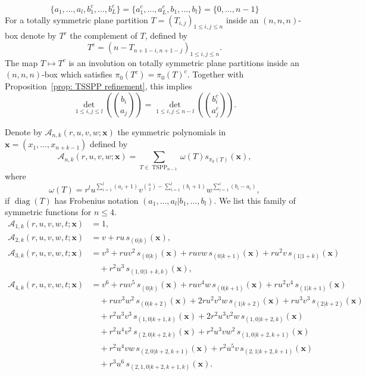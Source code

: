 \documentclass[11pt]{article}
\theoremstyle{definition}
\numberwithin{equation}{section}
\newcommand{\x}{\mathbf{x}}
\newcommand{\A}{\mathcal{A}}
\DeclareMathOperator{\TSPP}{TSPP}
\DeclareMathOperator{\diag}{diag}
\newcounter{x}
\newcounter{y}
\begin{document}
\begin{equation}
\label{eq: Frobenius coef of complement}
\{a_1,\ldots,a_l, b_1^c,\ldots, b_L^c \}=\{ a_1^c,\ldots,a_L^c,b_1,\ldots,b_l\}=\{0,\ldots,n-1\}
\end{equation}
For a totally symmetric plane partition $T=(T_{i,j})_{1 \leq i,j \leq n}$ inside an $(n,n,n)$-box denote by $T^c$ the complement of $T$, defined by
\[
T^c = (n-T_{n+1-i,n+1-j})_{1 \leq i,j \leq n}.
\]
The map $T \mapsto T^c$ is an involution on  totally symmetric plane partitions inside an $(n,n,n)$-box which satisfies $\pi_0(T^c) = \pi_0(T)^c$. Together with Proposition~\ref{prop: TSSPP refinement}, this implies
\begin{equation}
\label{eq: det of complement}
\det_{1 \leq i,j \leq l}\left( \binom{b_i}{a_j}\right) =
\det_{1 \leq i,j \leq n-l}\left( \binom{b_i^c}{a_j^c}\right).
\end{equation} 

Denote by $\A_{n,k}(r, u,v,w;\x)$ the symmetric polynomials in $\x=(x_1,\ldots,x_{n+k-1})$ defined by
\begin{equation}
\label{eq: def of A}
\A_{n,k}(r, u,v,w;\x)=\sum_{T \in \TSPP_{n-1}}\omega(T) s_{\pi_k(T)}(\x),
\end{equation}
where 
\begin{equation} 
\label{eq: weightpp} 
\omega(T)=r^l u^{\sum\limits_{i=1}^l (a_i+1)}  v^{\binom{n}{2}-\sum\limits_{i=1}^l (b_i+1)} w^{\sum\limits_{i=1}^l (b_i-a_i)},
\end{equation} 
if $\diag(T)$ has Frobenius notation $(a_1,\ldots,a_l|b_1,\ldots,b_l)$. We list this family of symmetric functions for $n\leq 4$.
\begin{align*}
\A_{1,k} (r, u,v,w,t;\x) &=1, \\
\A_{2,k} (r, u,v,w,t;\x) &= v + r u \,s_{(0|k)}(\x), \\
\A_{3,k} (r, u,v,w,t;\x) &=  v^3 + r  u v^2  \, s_{(0|k)}(\x) + 
	r  u v w  \,s_{(0|k+1)}(\x)+ r   u^2 v \,s_{(1|1+k)}(\x) \\
	& \quad +r^2 u^3 \,s_{(1,0|1+k,k)}(\x), \\ 
\A_{4,k} (r, u,v,w,t;\x) &=   v^6
	+r  u v^5  \,s_{(0|k)}(\x)
	+r  u v^4 w \,s_{(0|k+1)}(\x)
	+r  u^2 v^4 \,s_{(1|k+1)}(\x) \\
	& \quad 	+r  u v^3 w^2 \,s_{(0|k+2)}(\x) 
	+2r  u^2 v^3 w \,s_{(1|k+2)}(\x) 
	+r  u^3 v^3 \,s_{(2|k+2)}(\x)  \\
	& \quad 	+r^2  u^3 v^3 \,s_{(1,0|k+1,k)}(\x)
	+2r^2  u^3 v^2 w  \,s_{(1,0|k+2,k)}(\x) \\
	& \quad 	+r^2  u^4 v^2 \,s_{(2,0|k+2,k)}(\x)  
	 +r^2  u^3 v w^2 \,s_{(1,0|k+2,k+1)}(\x) \\
	& \quad+r^2  u^4 v w \,s_{(2,0|k+2,k+1)}(\x) 
	+r^2  u^5 v \,s_{(2,1|k+2,k+1)}(\x) \\
	 & \quad 	+r^3 u^6 \,s_{(2,1,0|k+2,k+1,k)}(\x).
\end{align*}
\end{document}
